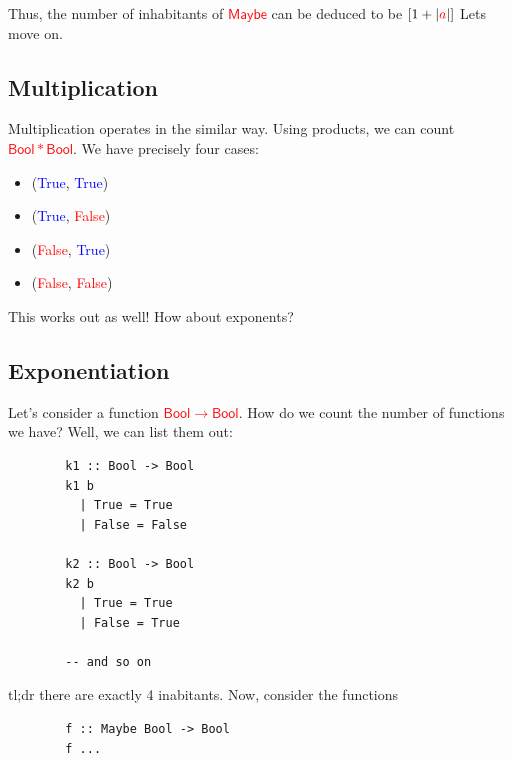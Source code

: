 \documentclass[tikz]{beamer}
\newcommand{\cat}[1]{\bm{ \mathsf{#1} }}
\newcommand{\red}[1]{\textcolor{red}{#1}}
\newcommand{\mred}[1]{\textcolor{red}{$#1$}}
\newcommand{\blue}[1]{\textcolor{blue}{#1}}
\theoremstyle{definition}
\begin{document}
\frame
{
	Thus, the number of inhabitants of \mred{\cat{Maybe}} can be deduced to be $[1 + |\red{a}|]$ Lets move on.
}

\subsection{Multiplication}

\frame
{

	Multiplication operates in the similar way. Using products, we can count \mred{\cat{Bool} * \cat{Bool}}. We have precisely four cases: 
	
	\begin{itemize}	
		\item (\blue{True}, \blue{True})
		\item(\blue{True}, \red{False})
		\item (\red{False}, \blue{True})
		\item (\red{False}, \red{False}) 
	\end{itemize}
}

\frame
{
	This works out as well! How about exponents?
}

\subsection{Exponentiation}

\begin{frame}[fragile]
	Let's consider a function \mred{\cat{Bool} \to \cat{Bool}}. How do we count the number of functions we have? Well, we can list them out: 
	
	\begin{verbatim}
		k1 :: Bool -> Bool
		k1 b 
		  | True = True
		  | False = False 
		
		k2 :: Bool -> Bool 
		k2 b 
		  | True = True
		  | False = True 
		  		
		-- and so on	
	\end{verbatim}
	
\end{frame}

\begin{frame}[fragile]

	tl;dr there are exactly 4 inabitants. Now, consider the functions
	
	\begin{verbatim}
		f :: Maybe Bool -> Bool
		f ...
	\end{verbatim}
\end{frame}
\end{document}
